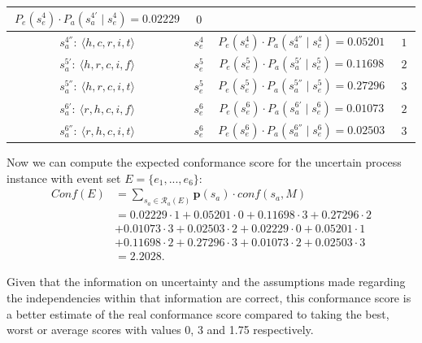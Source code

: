 \begin{table}[h]
\begin{tabular}{cccc}
	\multicolumn{1}{|c|}{$~ P_e(s_e^4) \cdot P_a(s_a^{4'} \mid s_e^4) = 0.02229 ~$} &
	\multicolumn{1}{|c|}{$~ 0 ~$}
\\ \hline
	\multicolumn{1}{|c|}{$s_a^{4''}: ~ \langle h,c,r,i,t \rangle$} & 
	\multicolumn{1}{|c|}{$s_e^4$} & 
	\multicolumn{1}{|c|}{$~ P_e(s_e^4) \cdot P_a(s_a^{4''} \mid s_e^4) = 0.05201~$} &
	\multicolumn{1}{|c|}{$~ 1 ~$}
\\ \hline
	\multicolumn{1}{|c|}{$s_a^{5'}: ~ \langle h,r,c,i,f\rangle$} & 
	\multicolumn{1}{|c|}{$s_e^5$} & 
	\multicolumn{1}{|c|}{$~ P_e(s_e^5) \cdot P_a(s_a^{5'} \mid s_e^5) = 0.11698~$} &
	\multicolumn{1}{|c|}{$~ 2 ~$}
\\ \hline
	\multicolumn{1}{|c|}{$s_a^{5''}: ~ \langle h,r,c,i,t\rangle$} & 
	\multicolumn{1}{|c|}{$s_e^5$} & 
	\multicolumn{1}{|c|}{$~ P_e(s_e^5) \cdot P_a(s_a^{5''} \mid s_e^5) = 0.27296~$} &
	\multicolumn{1}{|c|}{$~ 3 ~$}
\\ \hline
	\multicolumn{1}{|c|}{$s_a^{6'}: ~ \langle r,h,c,i,f\rangle$} & 
	\multicolumn{1}{|c|}{$s_e^6$} & 
	\multicolumn{1}{|c|}{$~ P_e(s_e^6) \cdot P_a(s_a^{6'} \mid s_e^6) = 0.01073~$} &
	\multicolumn{1}{|c|}{$~ 2 ~$}
\\ \hline
	\multicolumn{1}{|c|}{$s_a^{6''}: ~ \langle r,h,c,i,t\rangle$} & 
	\multicolumn{1}{|c|}{$s_e^6$} & 
	\multicolumn{1}{|c|}{$~ P_e(s_e^6) \cdot P_a(s_a^{6''} \mid s_e^6) = 0.02503~$} &
	\multicolumn{1}{|c|}{$~ 3 ~$}
\\ \hline
	\end{tabular}
	\label{table: p values}
\end{table} 
% 
%
%
Now we can compute the expected conformance score for the uncertain process instance with event set $E=\{e_1,...,e_6\}$:
\begin{align*}
Conf(E) &= \sum_{s_a \in \mathcal{R}_a(E)} \textbf{p}(s_a) \cdot conf(s_a,M) \\
&= 0.02229 \cdot 1 + 0.05201 \cdot 0 + 0.11698 \cdot 3 + 0.27296 \cdot 2 \\ 
&+ 0.01073 \cdot 3 + 0.02503 \cdot 2 +
0.02229 \cdot 0 + 0.05201 \cdot 1 \\
&+ 0.11698 \cdot 2 + 0.27296 \cdot 3 + 0.01073 \cdot 2 + 0.02503 \cdot 3 \\
&= 2.2028.
\end{align*}

Given that the information on uncertainty and the assumptions made regarding the independencies within that information are correct, this conformance score is a better estimate of the real conformance score compared to taking the best, worst or average scores with values 0, 3 and 1.75 respectively. 


